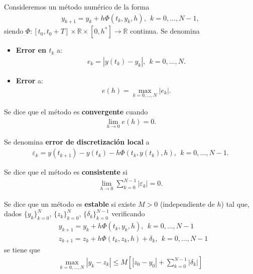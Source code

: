 \begin{defi}
    Consideremos un método numérico de la forma
    \begin{align*}
        y_{k+1} = y_k + h \Phi(t_k,y_k,h), \ \ k = 0,\ldots,N-1,
    \end{align*}
    siendo $\Phi : [t_0,t_0+T] \times \mathbb{R} \times [0,h^*] \longrightarrow \mathbb{R}$ continua. Se denomina
    \begin{itemize}
        \item \textbf{Error en $t_k$} a:
              \begin{align*}
                  e_k = |y(t_k) - y_k|, \ \ k = 0,\ldots,N.
              \end{align*}
        \item \textbf{Error} a:
              \begin{align*}
                  e(h) = \max_{k = 0,\ldots,N} |e_k|.
              \end{align*}
    \end{itemize}
\end{defi}

\begin{defi}
    Se dice que el método es \textbf{convergente} cuando
    \begin{align*}
        \lim_{h \to 0} e(h) = 0.
    \end{align*}
\end{defi}

\begin{defi}
    Se denomina \textbf{error de discretización local} a
    \begin{align*}
        \varepsilon_k = y(t_{k+1}) - y(t_k) - h\Phi(t_k,y(t_k),h), \ \ k = 0,\ldots,N-1.
    \end{align*}
\end{defi}

\begin{defi}
    Se dice que el método es \textbf{consistente }si
    \begin{align*}
        \lim_{h \to 0} \sum_{k=0}^{N-1} |\varepsilon_k| = 0 .
    \end{align*}
\end{defi}

\begin{defi}
    Se dice que un método es \textbf{estable} si existe $M > 0$ (independiente de $h$) tal que, dados $\{y_k\}_{k=0}^{N}$, $\{z_k\}_{k=0}^{N}$, $\{\delta_k\}_{k=0}^{N-1}$ verificando
    \begin{align*}
         & y_{k+1} = y_k + h\Phi(t_k,y_k,h), \ \ k = 0,\ldots,N-1            \\
         & z_{k+1} = z_k + h\Phi(t_k,z_k,h) + \delta_k, \ \ k = 0,\ldots,N-1
    \end{align*}
    se tiene que
    \begin{align*}
        \max_{k=0,\ldots,N} |y_k - z_k| \leq M\left[ |z_0 - y_0| + \sum_{k=0}^{N-1} |\delta_k| \right]
    \end{align*}
\end{defi}

